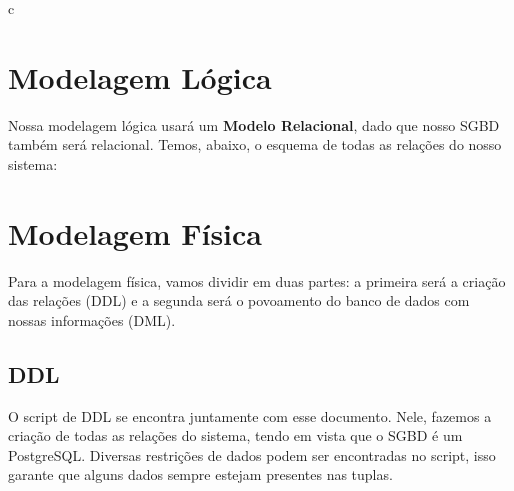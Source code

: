 c\documentclass{article}
\begin{document}
\section{Modelagem Lógica}
	Nossa modelagem lógica usará um \textbf{Modelo Relacional}, dado que nosso SGBD também será relacional. Temos, abaixo, o esquema de todas as relações do nosso sistema:\\


\section{Modelagem Física}
	Para a modelagem física, vamos dividir em duas partes: a primeira será a criação das relações (DDL) e a segunda será o povoamento do banco de dados com nossas informações (DML).
	\subsection{DDL}
		O script de DDL se encontra juntamente com esse documento. Nele, fazemos a criação de todas as relações do sistema, tendo em vista que o SGBD é um PostgreSQL. Diversas restrições de dados podem ser encontradas no script, isso garante que alguns dados sempre estejam presentes nas tuplas.
\end{document}
